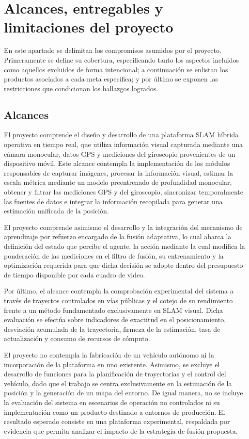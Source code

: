 \section{Alcances, entregables y limitaciones del proyecto}
En este apartado se delimitan los compromisos asumidos por el proyecto.
Primeramente se define su cobertura, especificando tanto los aspectos incluidos como aquellos excluidos de forma intencional; a continuación se enlistan los productos asociados a cada meta específica; y por último se exponen las restricciones que condicionan los hallazgos logrados.

\subsection{Alcances}

El proyecto comprende el diseño y desarrollo de una plataforma SLAM híbrida operativa en tiempo real, que utiliza información visual capturada mediante una cámara monocular, datos GPS y mediciones del giroscopio provenientes de un dispositivo móvil.
Este alcance contempla la implementación de los módulos responsables de capturar imágenes, procesar la información visual, estimar la escala métrica mediante un modelo preentrenado de profundidad monocular, obtener y filtrar las mediciones GPS y del giroscopio, sincronizar temporalmente las fuentes de datos e integrar la información recopilada para generar una estimación unificada de la posición.

El proyecto comprende asimismo el desarrollo y la integración del mecanismo de aprendizaje por refuerzo encargado de la fusión adaptativa, lo cual abarca la definición del estado que percibe el agente, la acción mediante la cual modifica la ponderación de las mediciones en el filtro de fusión, su entrenamiento y la optimización requerida para que dicha decisión se adopte dentro del presupuesto de tiempo disponible por cada cuadro de video.

Por último, el alcance contempla la comprobación experimental del sistema a través de trayectos controlados en vías públicas y el cotejo de su rendimiento frente a un método fundamentado exclusivamente en SLAM visual.
Dicha evaluación se efectúa sobre indicadores de exactitud en el posicionamiento, desviación acumulada de la trayectoria, firmeza de la estimación, tasa de actualización y consumo de recursos de cómputo.

El proyecto no contempla la fabricación de un vehículo autónomo ni la incorporación de la plataforma en uno existente. Asimismo, se excluye el desarrollo de funciones para la planificación de trayectorias y el control del vehículo, dado que el trabajo se centra exclusivamente en la estimación de la posición y la generación de un mapa del entorno.
De igual manera, no se incluye la evaluación del sistema en escenarios de operación no controlados ni su implementación como un producto destinado a entornos de producción.
El resultado esperado consiste en una plataforma experimental, respaldada por evidencia que permita analizar el impacto de la estrategia de fusión propuesta.

